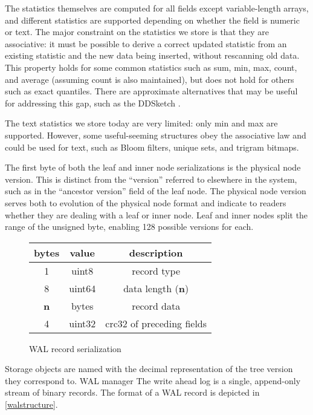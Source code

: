 \documentclass[9pt,twocolumn]{article}
\newcommand{\q}[1]{``#1''}
\begin{document}
    The statistics themselves are computed for all fields except variable-length
    arrays, and different statistics are supported depending on whether the field
    is numeric or text. The major constraint on the statistics we store is that
    they are associative: it must be possible to derive a correct updated
    statistic from an existing statistic and the new data being inserted, without
    rescanning old data. This property holds for some common statistics such as
    sum, min, max, count, and average (assuming count is also maintained), but
    does not hold for others such as exact quantiles. There are approximate
    alternatives that may be useful for addressing this gap, such as the
    DDSketch \cite{ddsketch}.

    The text statistics we store today are very limited: only min and max are
    supported. However, some useful-seeming structures obey the associative law
    and could be used for text, such as Bloom filters, unique sets, and trigram
    bitmaps.

    The first byte of both the leaf and inner node serializations is the physical
    node version. This is distinct from the \q{version} referred to elsewhere in
    the system, such as in the \q{ancestor version} field of the leaf node. The
    physical node version serves both to evolution of the physical node format
    and indicate to readers whether they are dealing with a leaf or inner node.
    Leaf and inner nodes split the range of the unsigned byte, enabling 128
    possible versions for each.

    \begin{figure}
      \begin{tabular}{ |c|c|c| }
        \hline
        bytes & value & description \\
        \hline
        1 & uint8 & record type \\
        8 & uint64 & data length (\textbf{n}) \\
        \textbf{n} & bytes & record data \\
        4 & uint32 & crc32 of preceding fields \\
        \hline
      \end{tabular}
      \caption{WAL record serialization}
      \label{walstructure}
    \end{figure}

    Storage objects are named with the decimal representation of the tree version
    they correspond to.  WAL manager The write ahead log is a single, append-only
    stream of binary records. The format of a WAL record is depicted in
    \autoref{walstructure}.
\end{document}

